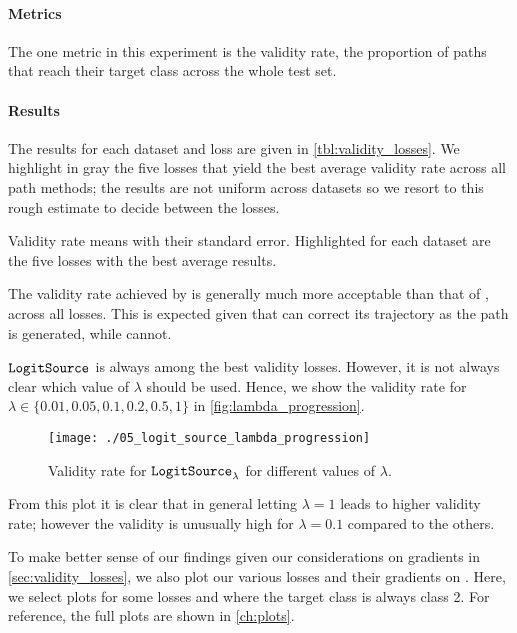 \documentclass[../main.tex]{subfiles}
\begin{document}
\paragraph{Metrics}

The one metric in this experiment is the validity rate, \ie{} the proportion of paths that reach their target class across the whole test set.

\paragraph{Results}

The results for each dataset and loss are given in \autoref{tbl:validity_losses}.
We highlight in gray the five losses that yield the best average validity rate across all path methods; the results are not uniform across datasets so we resort to this rough estimate to decide between the losses.

\begin{table}[H]
    \centering
    
    \caption{Validity rate means with their standard error. Highlighted for each dataset are the five losses with the best average results.}
    \label{tbl:validity_losses}
\end{table}



The validity rate achieved by \revise{} is generally much more acceptable than that of \ls{}, across all losses.
This is expected given that \revise{} can correct its trajectory as the path is generated, while \ls{} cannot.

$\mathtt{LogitSource}_{}$ is always among the best validity losses.
However, it is not always clear which value of $\lambda$ should be used.
Hence, we show the validity rate for $\lambda \in \{ 0.01, 0.05, 0.1, 0.2, 0.5, 1\}$ in \autoref{fig:lambda_progression}.

\begin{figure}[htbp]
    \centering
\texttt{[image: ./05\_logit\_source\_lambda\_progression]}

    \caption{Validity rate for $\mathtt{LogitSource}_{\lambda}$ for different values of $\lambda$.}
    \label{fig:lambda_progression}
\end{figure}

From this plot it is clear that in general letting $\lambda = 1$ leads to higher validity rate;
however the validity is unusually high for $\lambda = 0.1$ compared to the others.

To make better sense of our findings given our considerations on gradients in \autoref{sec:validity_losses},
we also plot our various losses and their gradients on \CakeOnSea.
Here, we select plots for some losses and where the target class is always class 2.
For reference, the full plots are shown in \autoref{ch:plots}.
\end{document}
